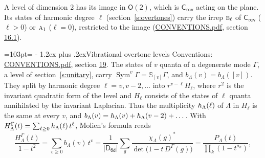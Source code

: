 \documentclass[10pt,a4paper]{article}
\makeatletter
\renewcommand\section{\@startsection{section}{1}{\z@}{-3ex plus -1ex minus -.2ex}%
  {1.2ex plus .2ex}{\normalfont\large\sffamily\bfseries\color{parttitle}}}
\newcommand{\needspace}[1]{\par\penalty-100\begingroup\dimen0=#1\relax\dimen2=\pagegoal
  \advance\dimen2-\pagetotal\ifdim\dimen0>\dimen2\relax\ifdim\dimen2>0pt\vfil\break\fi\fi
  \endgroup}
\numberwithin{equation}{section}
\newcommand{\grp}[1]{\mathsf{#1}}
\newcommand{\irr}[1]{\text{\normalfont\scshape #1}}
\newcommand{\repD}[1]{D^{#1}}
\newcommand{\irchar}[1]{\chi_{#1}}
\newcommand{\conj}[1]{{#1}^{*}}
\newcommand{\schur}[1]{\mathbb{S}_{#1}}
\newcommand{\shape}[1]{[#1]}
\makeatother
\begin{document}
A level of dimension 2 has its image in $\grp{O(2)}$, which is \href{Cinfv.pdf}{$\grp{C_{\infty v}}$} acting on the plane. \label{n:index.harmonic.degree}Its states of harmonic degree $\ell$ (section~\ref{s:overtones}) carry the irrep $\irr{e}_{\ell}$ of \href{Cinfv.pdf}{$\grp{C_{\infty v}}$} ($\ell > 0$) or $\irr{a}_{1}$ ($\ell = 0$), restricted to the image (\href{../../CONVENTIONS.pdf}{CONVENTIONS.pdf}, section \href{../../CONVENTIONS.pdf\#conv.16.1}{16.1}).
\needspace{103pt}
\section{Vibrational overtone levels}\label{s:overtones}
Conventions: \href{../../CONVENTIONS.pdf}{CONVENTIONS.pdf}, section \href{../../CONVENTIONS.pdf\#conv.19}{19}.
\leavevmode\label{n:index.quanta}\label{n:operator.symmetric.power}The states of $v$ quanta of a degenerate mode $\Gamma$, a level of section~\ref{s:unitary}, carry $\operatorname{Sym}^{v}\Gamma = \schur{\shape{v}}\Gamma$, and $b_\Lambda(v) = b_\Lambda(\shape{v})$. \label{n:local.quadratic.form}\label{n:set.harmonic}They split by harmonic degree $\ell = v, v - 2, \dots$ into $r^{v-\ell}H_\ell$, where $r^2$ is the invariant quadratic form of the level and $H_\ell$ consists of the states of $\ell$ quanta annihilated by the invariant Laplacian. \label{n:function.multiplicity.harmonic}Thus the multiplicity $\mathnormal{h}_\Lambda(\ell)$ of $\Lambda$ in $H_\ell$ is the same at every $v$, and $b_\Lambda(v) = \mathnormal{h}_\Lambda(v) + \mathnormal{h}_\Lambda(v - 2) + \dots$. \label{n:function.generating.level}With $H^{\Gamma}_\Lambda(t) = \sum_{\ell\ge0} \mathnormal{h}_\Lambda(\ell)\,t^{\ell}$, Molien's formula reads
\begin{equation}\label{e:molien}\frac{H^{\Gamma}_\Lambda(t)}{1 - t^2} = \sum_{v\ge0} b_\Lambda(v)\,t^v = \frac{1}{|\grp{D_{6d}}|}\sum_{g}\frac{\conj{\irchar{\Lambda}(g)}}{\det\bigl(1 - t\,\repD{\Gamma}(g)\bigr)} = \frac{P_\Lambda(t)}{\prod_k (1-t^{a_k})},\end{equation}
\end{document}
